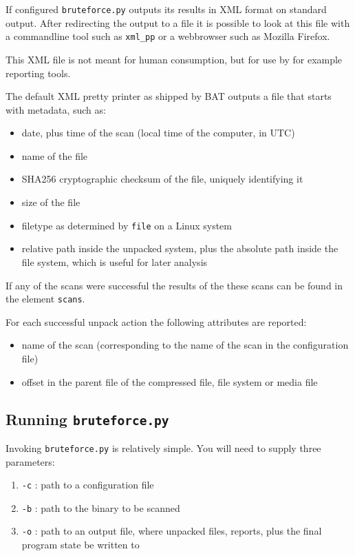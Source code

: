 \documentclass[10pt]{article}
\begin{document}
If configured \texttt{bruteforce.py} outputs its results in XML format on
standard output. After redirecting the output to a file it is possible to look
at this file with a commandline tool such as \texttt{xml\_pp} or a webbrowser
such as Mozilla Firefox.

This XML file is not meant for human consumption, but for use by for example
reporting tools.

The default XML pretty printer as shipped by BAT outputs a file that starts
with metadata, such as:

\begin{itemize}
\item date, plus time of the scan (local time of the computer, in UTC)
\item name of the file
\item SHA256 cryptographic checksum of the file, uniquely identifying it
\item size of the file
\item filetype as determined by \texttt{file} on a Linux system
\item relative path inside the unpacked system, plus the absolute path inside
the file system, which is useful for later analysis
\end{itemize}

If any of the scans were successful the results of the these scans can
be found in the element \texttt{scans}.

For each successful unpack action the following attributes are reported:

\begin{itemize}
\item name of the scan (corresponding to the name of the scan in the
configuration file)
\item offset in the parent file of the compressed file, file system or media
file
\end{itemize}

\subsection{Running \texttt{bruteforce.py}}

Invoking \texttt{bruteforce.py} is relatively simple. You will need to supply
three parameters:

\begin{enumerate}
\item \texttt{-c} : path to a configuration file
\item \texttt{-b} : path to the binary to be scanned
\item \texttt{-o} : path to an output file, where unpacked files, reports,
plus the final program state be written to
\end{enumerate}
\end{document}
